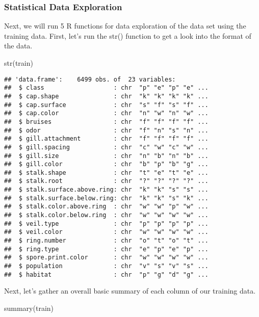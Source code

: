 \documentclass[
]{article}
\newenvironment{Shaded}{\begin{snugshade}}{\end{snugshade}}
\newcommand{\FunctionTok}[1]{\textcolor[rgb]{0.00,0.00,0.00}{#1}}
\newcommand{\NormalTok}[1]{#1}
\begin{document}
\hypertarget{statistical-data-exploration}{%
\subsubsection{Statistical Data
Exploration}\label{statistical-data-exploration}}

Next, we will run 5 R functions for data exploration of the data set
using the training data. First, let's run the str() function to get a
look into the format of the data.

\begin{Shaded}
\begin{Highlighting}[]
\FunctionTok{str}\NormalTok{(train)}
\end{Highlighting}
\end{Shaded}

\begin{verbatim}
## 'data.frame':    6499 obs. of  23 variables:
##  $ class                   : chr  "p" "e" "p" "e" ...
##  $ cap.shape               : chr  "k" "k" "k" "k" ...
##  $ cap.surface             : chr  "s" "f" "s" "f" ...
##  $ cap.color               : chr  "n" "w" "n" "w" ...
##  $ bruises                 : chr  "f" "f" "f" "f" ...
##  $ odor                    : chr  "f" "n" "s" "n" ...
##  $ gill.attachment         : chr  "f" "f" "f" "f" ...
##  $ gill.spacing            : chr  "c" "w" "c" "w" ...
##  $ gill.size               : chr  "n" "b" "n" "b" ...
##  $ gill.color              : chr  "b" "p" "b" "g" ...
##  $ stalk.shape             : chr  "t" "e" "t" "e" ...
##  $ stalk.root              : chr  "?" "?" "?" "?" ...
##  $ stalk.surface.above.ring: chr  "k" "k" "s" "s" ...
##  $ stalk.surface.below.ring: chr  "k" "k" "s" "k" ...
##  $ stalk.color.above.ring  : chr  "w" "w" "p" "w" ...
##  $ stalk.color.below.ring  : chr  "w" "w" "w" "w" ...
##  $ veil.type               : chr  "p" "p" "p" "p" ...
##  $ veil.color              : chr  "w" "w" "w" "w" ...
##  $ ring.number             : chr  "o" "t" "o" "t" ...
##  $ ring.type               : chr  "e" "p" "e" "p" ...
##  $ spore.print.color       : chr  "w" "w" "w" "w" ...
##  $ population              : chr  "v" "s" "v" "s" ...
##  $ habitat                 : chr  "p" "g" "d" "g" ...
\end{verbatim}

Next, let's gather an overall basic summary of each column of our
training data.

\begin{Shaded}
\begin{Highlighting}[]
\FunctionTok{summary}\NormalTok{(train)}
\end{Highlighting}
\end{Shaded}
\end{document}
